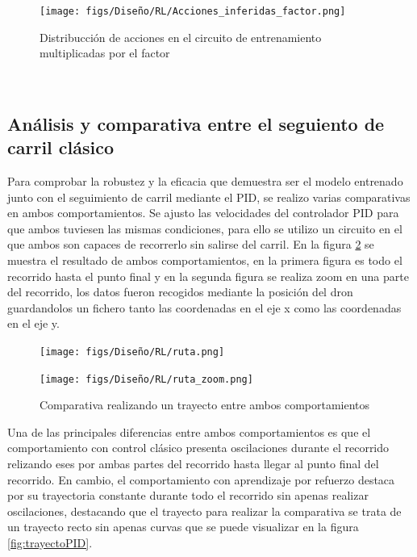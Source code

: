 \begin{figure} [H]
  \begin{center}
    \texttt{[image: figs/Diseño/RL/Acciones\_inferidas\_factor.png]}
  \end{center}
  \caption{Distribucción de acciones en el circuito de entrenamiento multiplicadas por el factor}
  \label{fig:inferencia_factor}
\end{figure}\


\subsection{Análisis y comparativa entre el seguiento de carril clásico}
\label{sec:Análisis y comparativa entre el seguiento de carril clásico}
Para comprobar la robustez y la eficacia que demuestra ser el modelo entrenado junto con el seguimiento de carril mediante el PID, se realizo varias comparativas en ambos
comportamientos. Se ajusto las velocidades del controlador PID para que ambos tuviesen las mismas condiciones, para ello se utilizo un circuito en el que ambos son capaces 
de recorrerlo sin salirse del carril. En la figura \ref{fig:comparativa} se muestra el resultado de ambos comportamientos, en la primera figura es todo el recorrido hasta el punto
final y en la segunda figura se realiza zoom en una parte del recorrido, los datos fueron recogidos mediante la posición del dron guardandolos un fichero tanto las coordenadas 
en el eje x como las coordenadas en el eje y. 
  
\begin{figure}[H]
  \centering
  \begin{minipage}{1.0\textwidth}
    \texttt{[image: figs/Diseño/RL/ruta.png]}
  \end{minipage}
  \hfill
  \begin{minipage}{1.0\textwidth}
    \texttt{[image: figs/Diseño/RL/ruta\_zoom.png]}
  \end{minipage}
  \caption{Comparativa realizando un trayecto entre ambos comportamientos}
  \label{fig:comparativa}
\end{figure}

Una de las principales diferencias entre ambos comportamientos es que el comportamiento con control clásico presenta oscilaciones durante el recorrido relizando eses 
por ambas partes del recorrido hasta llegar al punto final del recorrido. En cambio, el comportamiento con aprendizaje por refuerzo destaca por su trayectoria constante 
durante todo el recorrido sin apenas realizar oscilaciones, destacando que el trayecto para realizar la comparativa se trata de un trayecto recto sin apenas curvas que se 
puede visualizar en la figura \ref{fig:trayectoPID}.

